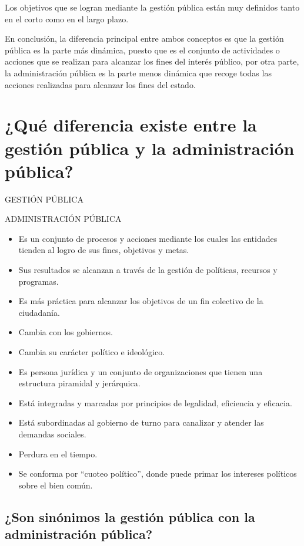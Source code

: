 \documentclass[
  letterpaper,
  DIV=11,
  numbers=noendperiod]{scrartcl}
\providecommand{\tightlist}{%
  \setlength{\itemsep}{0pt}\setlength{\parskip}{0pt}}\usepackage{longtable,booktabs,array}
\begin{document}
Los objetivos que se logran mediante la gestión pública están muy
definidos tanto en el corto como en el largo plazo.

En conclusión, la diferencia principal entre ambos conceptos es que la
gestión pública es la parte más dinámica, puesto que es el conjunto de
actividades o acciones que se realizan para alcanzar los fines del
interés público, por otra parte, la administración pública es la parte
menos dinámica que recoge todas las acciones realizadas para alcanzar
los fines del estado.

\hypertarget{quuxe9-diferencia-existe-entre-la-gestiuxf3n-puxfablica-y-la-administraciuxf3n-puxfablica}{%
\section{¿Qué diferencia existe entre la gestión pública y la
administración
pública?}\label{quuxe9-diferencia-existe-entre-la-gestiuxf3n-puxfablica-y-la-administraciuxf3n-puxfablica}}

GESTIÓN PÚBLICA

ADMINISTRACIÓN PÚBLICA

\begin{itemize}
\tightlist
\item
  Es un conjunto de procesos y acciones mediante los cuales las
  entidades tienden al logro de sus fines, objetivos y metas.
\item
  Sus resultados se alcanzan a través de la gestión de políticas,
  recursos y programas.
\item
  Es más práctica para alcanzar los objetivos de un fin colectivo de la
  ciudadanía.
\item
  Cambia con los gobiernos.
\item
  Cambia su carácter político e ideológico.
\item
  Es persona jurídica y un conjunto de organizaciones que tienen una
  estructura piramidal y jerárquica.
\item
  Está integradas y marcadas por principios de legalidad, eficiencia y
  eficacia.
\item
  Está subordinadas al gobierno de turno para canalizar y atender las
  demandas sociales.
\item
  Perdura en el tiempo.
\item
  Se conforma por ``cuoteo político'', donde puede primar los intereses
  políticos sobre el bien común.
\end{itemize}

\hypertarget{son-sinuxf3nimos-la-gestiuxf3n-puxfablica-con-la-administraciuxf3n-puxfablica}{%
\subsection{¿Son sinónimos la gestión pública con la administración
pública?}\label{son-sinuxf3nimos-la-gestiuxf3n-puxfablica-con-la-administraciuxf3n-puxfablica}}
\end{document}
